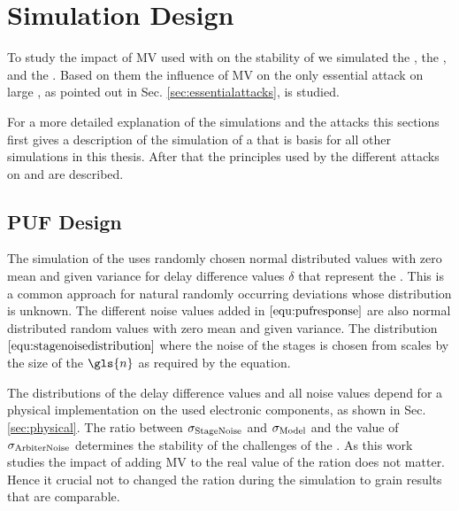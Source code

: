 \chapter{Simulation Design}
\label{cap:simulationdesign}

To study the impact of \ac{MV} used with \apufs on the stability of \apuf we simulated the \apuf, the \mpuf, and the \mxpuf.
Based on them the influence of \ac{MV} on the only essential attack on large \xpufs, as pointed out in Sec. \ref{sec:essentialattacks}, is studied.


For a more detailed explanation of the simulations and the attacks this sections first gives a description of the simulation of a \apuf that is basis for all other \puf simulations in this thesis.
After that the principles used by the different attacks on \mpufs and \mxpufs are described.



\section{\ac{PUF} Design}
\label{sec:pufsimulation}

The simulation of the \apuf uses randomly chosen normal distributed values with zero mean and given variance for delay difference values $\delta$ that represent the \apuf.
This is a common approach for natural randomly occurring deviations whose distribution is unknown.
The different noise values added in $\ref{equ:pufresponse}$ are also normal distributed random values with zero mean and given variance.
The distribution $\ref{equ:stagenoisedistribution}$ where the noise of the stages is chosen from scales by the size of the \apuf $\gls{n}$ as required by the equation.

The distributions of the delay difference values and all noise values depend for a physical \apuf implementation on the used electronic components, as shown in Sec. \ref{sec:physical}.
The ratio between $\sigma_{\mathrm{Stage Noise}}$ and $\sigma_{\mathrm{Model}}$ and the value of $\sigma_{\mathrm{Arbiter Noise}}$ determines the stability of the challenges of the \apuf.
As this work studies the impact of adding \ac{MV} to \apufs the real value of the ration does not matter.
Hence it crucial not to changed the ration during the simulation to grain results that are comparable.

